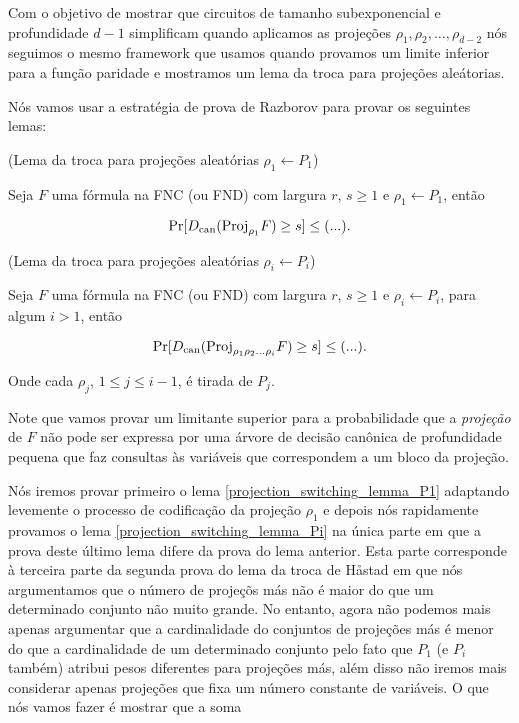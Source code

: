 Com o objetivo de mostrar que circuitos de tamanho subexponencial e profundidade $d - 1$ simplificam quando aplicamos as projeções $\rho_{1}, \rho_{2}, \dots, \rho_{d - 2}$ nós seguimos o mesmo framework que usamos quando provamos um limite inferior para a função paridade e mostramos um lema da troca para projeções aleátorias.

Nós vamos usar a estratégia de prova de Razborov para provar os seguintes lemas:

\begin{lema} (Lema da troca para projeções aleatórias $\rho_{1} \leftarrow P_{1}$) \label{projection_switching_lemma_P1}

Seja $F$ uma fórmula na FNC (ou FND) com largura $r$, $s \geq 1$ e $\rho_{1} \leftarrow P_{1}$, então

\begin{equation*}
	\Pr[D_{\text{can}}(\text{Proj}_{\rho_{1}}F) \geq s] \leq (...).
\end{equation*} 

\end{lema}

\begin{lema} (Lema da troca para projeções aleatórias $\rho_{i} \leftarrow P_{i}$) \label{projection_switching_lemma_Pi}

Seja $F$ uma fórmula na FNC (ou FND) com largura $r$, $s \geq 1$ e $\rho_{i} \leftarrow P_{i}$, para algum $i > 1$, então

\begin{equation*}
	\Pr[D_{\text{can}}(\text{Proj}_{\rho_{1}\rho_{2}\dots\rho_{i}}F) \geq s] \leq (...).
\end{equation*} 

Onde cada $\rho_{j}$, $1 \leq j \leq i - 1$, é tirada de $P_{j}$.

\end{lema}

Note que vamos provar um limitante superior para a probabilidade que a \emph{projeção} de $F$ não pode ser expressa por uma árvore de decisão canônica de profundidade pequena que faz consultas às variáveis que correspondem a um bloco da projeção.

Nós iremos provar primeiro o lema \ref{projection_switching_lemma_P1} adaptando levemente o processo de codificação da projeção $\rho_{1}$ e depois nós rapidamente provamos o lema \ref{projection_switching_lemma_Pi} na única parte em que a prova deste último lema difere da prova do lema anterior. Esta parte corresponde à terceira parte da segunda prova do lema da troca de Håstad em que nós argumentamos que o número de projeçõs más não é maior do que um determinado conjunto não muito grande. No entanto, agora não podemos mais apenas argumentar que a cardinalidade do conjuntos de projeções más é menor do que a cardinalidade de um determinado conjunto pelo fato que $P_{1}$ (e $P_{i}$ também) atribui pesos diferentes para projeções más, além disso não iremos mais considerar apenas projeções que fixa um número constante de variáveis. O que nós vamos fazer é mostrar que a soma

